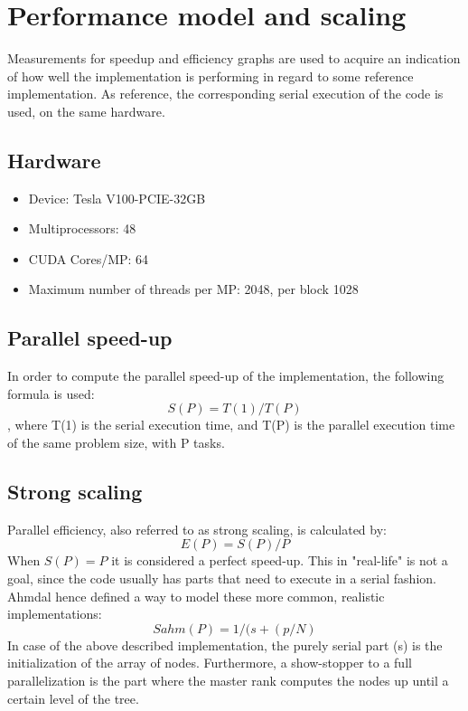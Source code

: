 \documentclass[11pt]{article}
\begin{document}
\section{Performance model and scaling}
Measurements for speedup and efficiency graphs are used to acquire an indication of how well the implementation is performing in regard to some reference
implementation. As reference, the corresponding serial execution of the code is used, on the same hardware.
\subsection{Hardware}
\begin{itemize}
\item Device: Tesla V100-PCIE-32GB
\item Multiprocessors: 48
\item CUDA Cores/MP: 64
\item Maximum number of threads per MP: 2048, per block 1028
\end{itemize}
\subsection{Parallel speed-up}
In order to compute the parallel speed-up of the implementation, the following formula is used:
\begin{equation} \label{eqn}
	S(P) = {T(1) / T(P)} 
\end{equation}
, where T(1) is the serial execution time, and T(P) is the parallel execution time of the same problem size, with P tasks.
\subsection{Strong scaling}
Parallel efficiency, also referred to as strong scaling, is calculated by:
\begin{equation} \label{eqn}
	E(P) = {S(P) / P} 
\end{equation}
When $S(P)=P$ it is considered a perfect speed-up. This in "real-life" is not a goal, since the code usually has parts that need to execute in a serial fashion. Ahmdal hence defined a way to model these more common, realistic implementations:
\begin{equation} \label{eqn}
	Sahm(P) = {1 /(s + (p/N)} 
\end{equation}
In case of the above described implementation, the purely serial part (s) is the initialization of the array of nodes. Furthermore, a show-stopper to a full parallelization is the part where the master rank computes the nodes up until a certain level of the tree.
\end{document}
